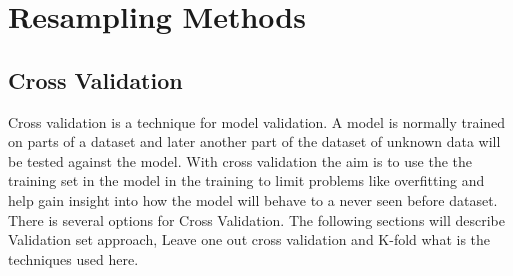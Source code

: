 \chapter{Resampling Methods} \label{ch:resamplingMethods}


\section{Cross Validation} \label{sc:crossValidation}
Cross validation is a technique for model validation. A model is normally trained on parts of a dataset and later another part of the dataset of unknown data will be tested against the model. With cross validation the aim is to use the the training set in the model in the training to limit problems like overfitting and help gain insight into how the model will behave to a never seen before dataset. There is several options for Cross Validation. The following sections will describe Validation set approach, Leave one out cross validation and K-fold what is the techniques used here.




